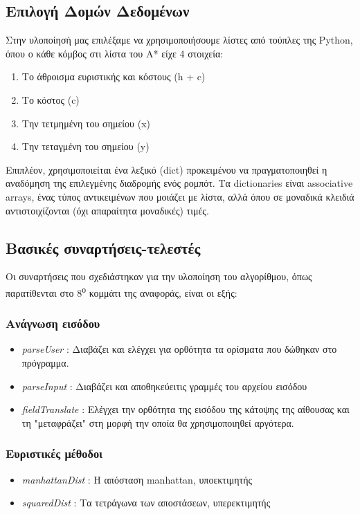 \documentclass[a4paper,9pt]{article}
\begin{document}


\subsection{Επιλογή Δομών Δεδομένων}
Στην υλοποίησή μας επιλέξαμε να χρησιμοποιήσουμε λίστες από τούπλες της Python,
όπου ο κάθε κόμβος στι λίστα του A* είχε 4 στοιχεία:
\begin{enumerate}
    \item Το άθροισμα ευριστικής και κόστους (h + c)
    \item Το κόστος (c)
    \item Την τετμημένη του σημείου (x)
    \item Την τεταγμένη του σημείου (y)
\end{enumerate}

Επιπλέον, χρησιμοποιείται ένα λεξικό (dict) προκειμένου να
πραγματοποιηθεί η αναδόμηση της επιλεγμένης διαδρομής ενός ρομπότ. Τα
dictionaries είναι associative arrays, ένας τύπος αντικειμένων που μοιάζει με
λίστα, αλλά όπου σε μοναδικά κλειδιά αντιστοιχίζονται (όχι απαραίτητα
μοναδικές) τιμές.



\subsection{Βασικές συναρτήσεις-τελεστές}
Οι συναρτήσεις που σχεδιάστηκαν για την υλοποίηση του αλγορίθμου, όπως
παρατίθενται στο 8\textsuperscript{ο} κομμάτι της αναφοράς, είναι οι εξής:
\subsubsection{Ανάγνωση εισόδου}
\begin{itemize}
    \item \emph{parseUser} : Διαβάζει και ελέγχει για ορθότητα τα ορίσματα
        που δώθηκαν στο πρόγραμμα.
    \item \emph{parseInput} : Διαβάζει και αποθηκεύειτις γραμμές του αρχείου
        εισόδου
    \item \emph{fieldTranslate} : Ελέγχει την ορθότητα της εισόδου της
        κάτοψης της αίθουσας και τη "μεταφράζει" στη μορφή την οποία θα
        χρησιμοποιηθεί αργότερα.
\end{itemize}
\subsubsection{Eυριστικές μέθοδοι}
\begin{itemize}
    \item \emph{manhattanDist} : Η απόσταση manhattan, υποεκτιμητής
    \item \emph{squaredDist} : Τα τετράγωνα των αποστάσεων, υπερεκτιμητής
\end{itemize}
\end{document}
